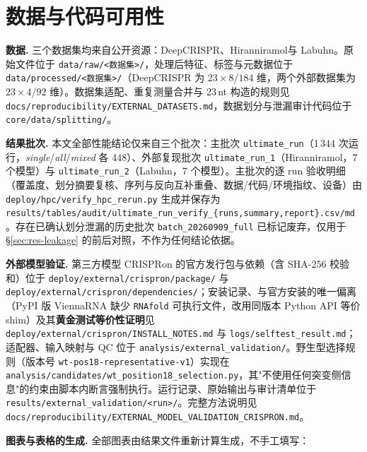 \section*{数据与代码可用性}
\label{sec:availability}

\textbf{数据.} 三个数据集均来自公开资源：DeepCRISPR\citep{Chuai2018GenomeBiol}、Hiranniramol\citep{Hiranniramol2020Bioinformatics}与 Labuhn\citep{Labuhn2018NAR}。原始文件位于 \texttt{data/raw/<数据集>/}，处理后特征、标签与元数据位于 \texttt{data/processed/<数据集>/}（DeepCRISPR 为 $23\times8$/$184$ 维，两个外部数据集为 $23\times4$/$92$ 维）。数据集适配、重复测量合并与 23\,nt 构造的规则见 \texttt{docs/reproducibility/EXTERNAL\_DATASETS.md}，数据划分与泄漏审计代码位于 \texttt{core/data/splitting/}。

\textbf{结果批次.} 本文全部性能结论仅来自三个批次：主批次 \texttt{ultimate\_run}（1\,344 次运行，\emph{single}/\emph{all}/\emph{mixed} 各 448）、外部复现批次 \texttt{ultimate\_run\_1}（Hiranniramol，7 个模型）与 \texttt{ultimate\_run\_2}（Labuhn，7 个模型）。主批次的逐 run 验收明细（覆盖度、划分摘要复核、序列与反向互补重叠、数据/代码/环境指纹、设备）由 \texttt{deploy/hpc/verify\_hpc\_rerun.py} 生成并保存为 \texttt{results/tables/audit/ultimate\_run\_verify\_\{runs,summary,report\}.csv/md}。存在已确认划分泄漏的历史批次 \texttt{batch\_20260909\_full} 已标记废弃，仅用于 \S\ref{sec:res-leakage} 的前后对照，不作为任何结论依据。

\textbf{外部模型验证.} 第三方模型 CRISPRon 的官方发行包与依赖（含 SHA-256 校验和）位于 \texttt{deploy/external/crispron/package/} 与 \texttt{deploy/external/crispron/dependencies/}；安装记录、与官方安装的唯一偏离（PyPI 版 ViennaRNA 缺少 \texttt{RNAfold} 可执行文件，改用同版本 Python API 等价 shim）及其\textbf{黄金测试等价性证明}见 \texttt{deploy/external/crispron/INSTALL\_NOTES.md} 与 \texttt{logs/selftest\_result.md}；适配器、输入映射与 QC 位于 \texttt{analysis/external\_validation/}。野生型选择规则（版本号 \texttt{wt-pos18-representative-v1}）实现在 \texttt{analysis/candidates/wt\_position18\_selection.py}，其"不使用任何突变侧信息"的约束由脚本内断言强制执行。运行记录、原始输出与审计清单位于 \texttt{results/external\_validation/<run>/}。完整方法说明见 \texttt{docs/reproducibility/EXTERNAL\_MODEL\_VALIDATION\_CRISPRON.md}。

\textbf{图表与表格的生成.} 全部图表由结果文件重新计算生成，不手工填写：

